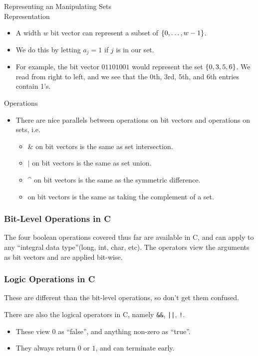 \documentclass[class=article, crop=false]{standalone}
\begin{document}
  \begin{example}{Representing an Manipulating Sets} \\[10pt]
    Representation
    \begin{itemize}
      \item A width $w$ bit vector can represent a subset of $\left\{0,\dotsc,w-1\right\}$.
      \item We do this by letting $a_j = 1$ if $j$ is in our set.
      \item For example, the bit vector $01101001$ would represent the set $\left\{0, 3, 5, 6\right\}$. We read from right to left, and we see that the 0th, 3rd, 5th, and 6th entries contain 1's.
    \end{itemize}
    Operations
    \begin{itemize}
      \item There are nice parallels between operations on bit vectors and operations on sets, i.e.
      \begin{itemize}
        \item \& on bit vectors is the same as set intersection.
        \item $\vert$ on bit vectors is the same as set union.
        \item \^{} on bit vectors is the same as the symmetric difference.
        \item \texttildelow\phantom{ }on bit vectors is the same as taking the complement of a set.
      \end{itemize}
    \end{itemize}
  \end{example}
  \subsubsection{Bit-Level Operations in C}
  The four boolean operations covered thus far are available in C, and can apply to any ``integral data type''(long, int, char, etc). The operators view the arguments as bit vectors and are applied bit-wise.
  \subsubsection{Logic Operations in C}
  \begin{note}{}
    These are different than the bit-level operations, so don't get them confused.
  \end{note}
  There are also the logical operators in C, namely \texttt{\&\&}, \texttt{||}, \texttt{!}.
  \begin{itemize}
    \item These view $0$ as ``false'', and anything non-zero as ``true''.
    \item They always return $0$ or $1$, and can terminate early.
  \end{itemize}
\end{document}
